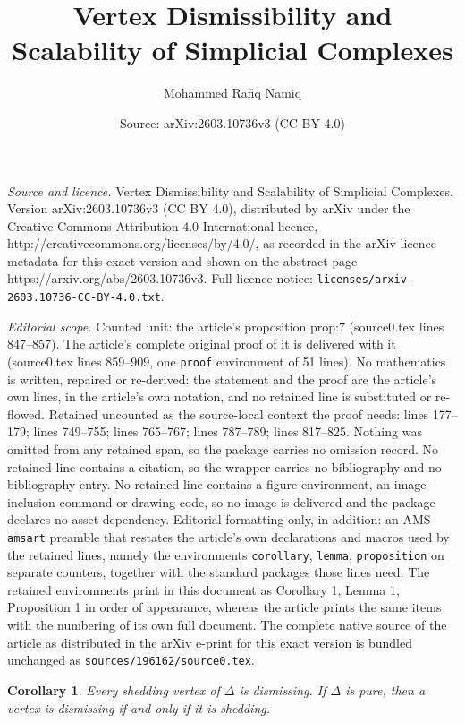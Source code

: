 \documentclass[10pt,a4paper]{amsart}
\title{Vertex Dismissibility and Scalability of Simplicial Complexes}
\author{Mohammed Rafiq Namiq}
\date{Source: arXiv:2603.10736v3 (CC BY 4.0)}
\newtheorem{corollary}{Corollary}
\begin{document}
\maketitle

\noindent\emph{Source and licence.} Vertex Dismissibility and Scalability of Simplicial Complexes. Version arXiv:2603.10736v3 (CC BY 4.0), distributed by arXiv under the Creative Commons Attribution 4.0 International licence, http://creativecommons.org/licenses/by/4.0/, as recorded in the arXiv licence metadata for this exact version and shown on the abstract page https://arxiv.org/abs/2603.10736v3. Full licence notice: \texttt{licenses/arxiv-2603.10736-CC-BY-4.0.txt}.\par\smallskip

\noindent\textit{Editorial scope.} Counted unit: the article's proposition prop:7 (source0.tex lines 847--857). The article's complete original proof of it is delivered with it (source0.tex lines 859--909, one \texttt{proof} environment of 51 lines). No mathematics is written, repaired or re-derived: the statement and the proof are the article's own lines, in the article's own notation, and no retained line is substituted or re-flowed.  Retained uncounted as the source-local context the proof needs: lines 177--179; lines 749--755; lines 765--767; lines 787--789; lines 817--825.  Nothing was omitted from any retained span, so the package carries no omission record.  No retained line contains a citation, so the wrapper carries no bibliography and no bibliography entry.  No retained line contains a figure environment, an image-inclusion command or drawing code, so no image is delivered and the package declares no asset dependency.  Editorial formatting only, in addition: an AMS \texttt{amsart} preamble that restates the article's own declarations and macros used by the retained lines, namely the environments \texttt{corollary}, \texttt{lemma}, \texttt{proposition} on separate counters, together with the standard packages those lines need.  The retained environments print in this document as Corollary 1, Lemma 1, Proposition 1 in order of appearance, whereas the article prints the same items with the numbering of its own full document.  The complete native source of the article as distributed in the arXiv e-print for this exact version is bundled unchanged as \texttt{sources/196162/source0.tex}.
	\begin{corollary}\label{cor:1}
		Every shedding vertex of $\Delta$ is dismissing.  If $\Delta$ is pure, then a vertex is dismissing if and only if it is shedding.
	\end{corollary}
\end{document}
